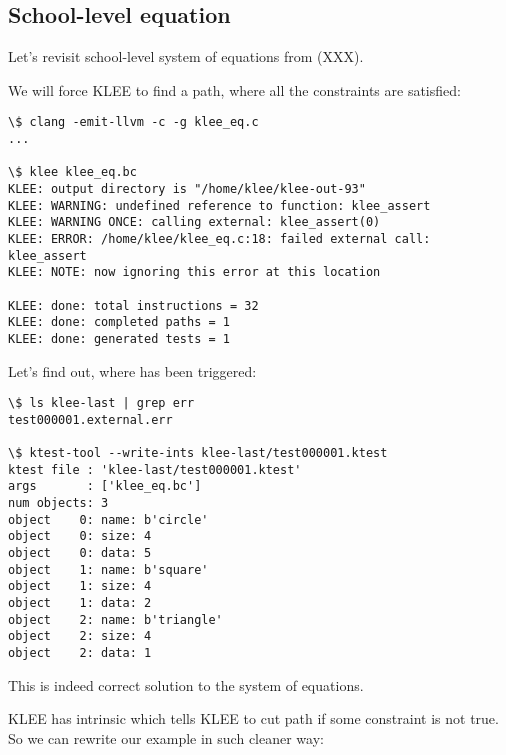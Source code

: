 \subsection{School-level equation}

Let's revisit school-level system of equations from (XXX). %

We will force KLEE to find a path, where all the constraints are satisfied:



\begin{lstlisting}
\$ clang -emit-llvm -c -g klee_eq.c
...

\$ klee klee_eq.bc
KLEE: output directory is "/home/klee/klee-out-93"
KLEE: WARNING: undefined reference to function: klee_assert
KLEE: WARNING ONCE: calling external: klee_assert(0)
KLEE: ERROR: /home/klee/klee_eq.c:18: failed external call: klee_assert
KLEE: NOTE: now ignoring this error at this location

KLEE: done: total instructions = 32
KLEE: done: completed paths = 1
KLEE: done: generated tests = 1
\end{lstlisting}

Let's find out, where  has been triggered:

\begin{lstlisting}
\$ ls klee-last | grep err
test000001.external.err

\$ ktest-tool --write-ints klee-last/test000001.ktest
ktest file : 'klee-last/test000001.ktest'
args       : ['klee_eq.bc']
num objects: 3
object    0: name: b'circle'
object    0: size: 4
object    0: data: 5
object    1: name: b'square'
object    1: size: 4
object    1: data: 2
object    2: name: b'triangle'
object    2: size: 4
object    2: data: 1
\end{lstlisting}

This is indeed correct solution to the system of equations.

KLEE has intrinsic  which tells KLEE to cut path if some constraint is not true.
So we can rewrite our example in such cleaner way:




